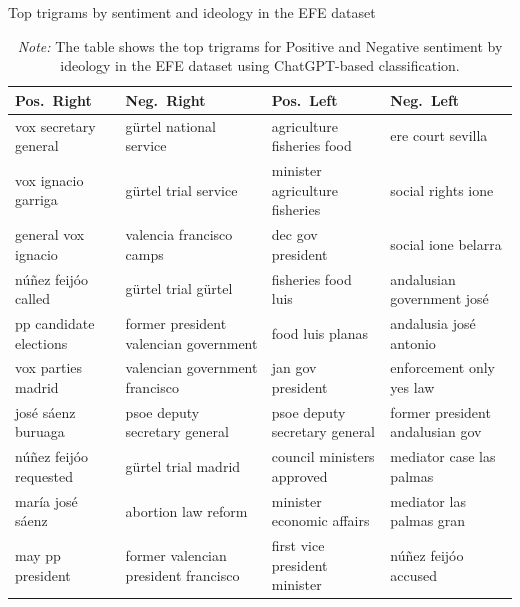 \documentclass[12pt]{article}
\begin{document}
\begin{table}[!htb]
\centering
\scriptsize
\caption{Top trigrams by sentiment and ideology in the  EFE dataset}
\label{tab:top_trigrams_combined}
\begin{tabular}{|l|l|l|l|}
	\hline
	\textbf{Pos.\ Right} & \textbf{Neg.\ Right} & \textbf{Pos.\ Left} & \textbf{Neg.\ Left} \\
	\hline
	vox secretary general          & gürtel national service        & agriculture fisheries food   & ere court sevilla                \\
	vox ignacio garriga            & gürtel trial service           & minister agriculture fisheries & social rights ione              \\
	general vox ignacio            & valencia francisco camps       & dec gov president            & social ione belarra             \\
	núñez feijóo called            & gürtel trial gürtel            & fisheries food luis          & andalusian government josé      \\
	pp candidate elections         & former president valencian government & food luis planas         & andalusia josé antonio          \\
	vox parties madrid             & valencian government francisco & jan gov president            & enforcement only yes law        \\
	josé sáenz buruaga             & psoe deputy secretary general  & psoe deputy secretary general & former president andalusian gov \\
	núñez feijóo requested         & gürtel trial madrid            & council ministers approved   & mediator case las palmas        \\
	maría josé sáenz               & abortion law reform            & minister economic affairs    & mediator las palmas gran        \\
	may pp president               & former valencian president francisco & first vice president minister & núñez feijóo accused      \\
	\hline
\end{tabular}
\caption*{\small \textit{Note:} The table shows the top trigrams for Positive and Negative sentiment by ideology in the EFE dataset using ChatGPT-based classification.}
\label{tab:top_trigrams}
\end{table}
\end{document}
